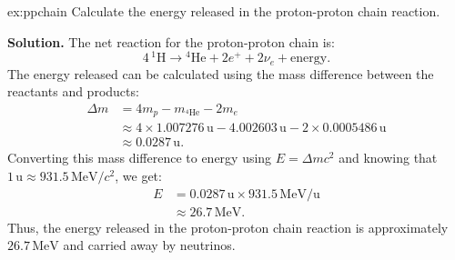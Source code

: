 \begin{example}{}{ex:ppchain}
Calculate the energy released in the proton-proton chain reaction.

\smallskip\textbf{Solution.}
The net reaction for the proton-proton chain is:    
\begin{equation}
    4\,{}^1\text{H}\rightarrow{}^4\text{He}+2e^++2\nu_e+\text{energy}.  
\end{equation}
The energy released can be calculated using the mass difference between the reactants and products:
\begin{align*}
\Delta m &= 4m_p - m_{^4\text{He}} - 2m_e \\
&\approx 4 \times 1.007276\,\text{u} - 4.002603\,\text{u} - 2 \times 0.0005486\,\text{u} \\
&\approx 0.0287\,\text{u}.  
\end{align*}
Converting this mass difference to energy using $E = \Delta m c^2$ and
knowing that $1\,\text{u} \approx 931.5\,\text{MeV}/c^2$, we get:
\begin{align*}
E &= 0.0287\,\text{u} \times 931.5\,\text{MeV}/\text{u} \\
&\approx 26.7\,\text{MeV}.
\end{align*}
Thus, the energy released in the proton-proton chain reaction is approximately $26.7\,\text{MeV}$ and carried away by neutrinos.
\end{example}

